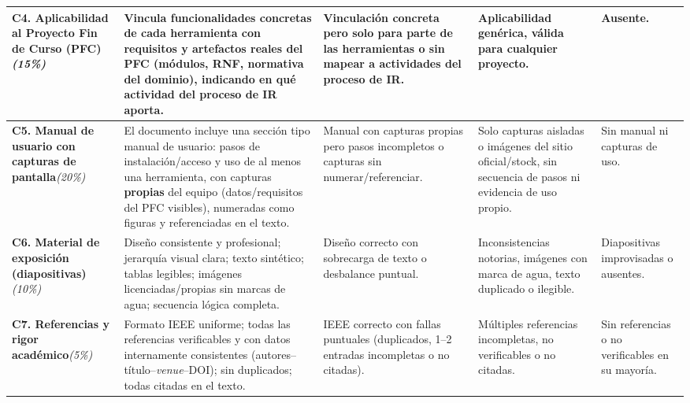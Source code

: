 \documentclass[10pt]{article}
\begin{document}
\begin{landscape}
\begin{longtable}{|L{3.0cm}|L{5.7cm}|L{5.4cm}|L{4.9cm}|L{4.3cm}|}
\textbf{C4. Aplicabilidad al Proyecto Fin de Curso (PFC)}\newline\textit{(15\%)} &
Vincula funcionalidades concretas de cada herramienta con requisitos y artefactos \textbf{reales} del PFC (m\'odulos, RNF, normativa del dominio), indicando en qu\'e actividad del proceso de IR aporta. &
Vinculaci\'on concreta pero solo para parte de las herramientas o sin mapear a actividades del proceso de IR. &
Aplicabilidad gen\'erica, v\'alida para cualquier proyecto. &
Ausente. \\
\hline

\textbf{C5. Manual de usuario con capturas de pantalla}\newline\textit{(20\%)} &
El documento incluye una secci\'on tipo manual de usuario: pasos de instalaci\'on/acceso y uso de al menos una herramienta, con capturas \textbf{propias} del equipo (datos/requisitos del PFC visibles), numeradas como figuras y referenciadas en el texto. &
Manual con capturas propias pero pasos incompletos o capturas sin numerar/referenciar. &
Solo capturas aisladas o im\'agenes del sitio oficial/stock, sin secuencia de pasos ni evidencia de uso propio. &
Sin manual ni capturas de uso. \\
\hline

\textbf{C6. Material de exposici\'on (diapositivas)}\newline\textit{(10\%)} &
Dise\~no consistente y profesional; jerarqu\'ia visual clara; texto sint\'etico; tablas legibles; im\'agenes licenciadas/propias sin marcas de agua; secuencia l\'ogica completa. &
Dise\~no correcto con sobrecarga de texto o desbalance puntual. &
Inconsistencias notorias, im\'agenes con marca de agua, texto duplicado o ilegible. &
Diapositivas improvisadas o ausentes. \\
\hline

\textbf{C7. Referencias y rigor acad\'emico}\newline\textit{(5\%)} &
Formato IEEE uniforme; todas las referencias verificables y con datos internamente consistentes (autores–t\'itulo–\textit{venue}–DOI); sin duplicados; todas citadas en el texto. &
IEEE correcto con fallas puntuales (duplicados, 1--2 entradas incompletas o no citadas). &
M\'ultiples referencias incompletas, no verificables o no citadas. &
Sin referencias o no verificables en su mayor\'ia. \\
\hline

\end{longtable}
\end{landscape}
\end{document}
